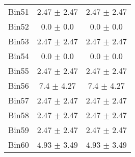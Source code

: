 \begin{tabular}{|c|c|c|}
     Bin51 & 2.47 $\pm$ 2.47 & 2.47 $\pm$ 2.47 \\ \cline{1-3} 
     Bin52 & 0.0 $\pm$ 0.0 & 0.0 $\pm$ 0.0 \\ \cline{1-3} 
     Bin53 & 2.47 $\pm$ 2.47 & 2.47 $\pm$ 2.47 \\ \cline{1-3} 
     Bin54 & 0.0 $\pm$ 0.0 & 0.0 $\pm$ 0.0 \\ \cline{1-3} 
     Bin55 & 2.47 $\pm$ 2.47 & 2.47 $\pm$ 2.47 \\ \cline{1-3} 
     Bin56 & 7.4 $\pm$ 4.27 & 7.4 $\pm$ 4.27 \\ \cline{1-3} 
     Bin57 & 2.47 $\pm$ 2.47 & 2.47 $\pm$ 2.47 \\ \cline{1-3} 
     Bin58 & 2.47 $\pm$ 2.47 & 2.47 $\pm$ 2.47 \\ \cline{1-3} 
     Bin59 & 2.47 $\pm$ 2.47 & 2.47 $\pm$ 2.47 \\ \cline{1-3} 
     Bin60 & 4.93 $\pm$ 3.49 & 4.93 $\pm$ 3.49 \\ \cline{1-3} 
  \end{tabular}
